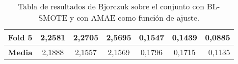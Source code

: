 \begin{table}[H]
{\begin{tabular}{|crrrrrr|}
\multicolumn{1}{|c|}{\textbf{Fold 5}} & \multicolumn{1}{c|}{2,2581}            & \multicolumn{1}{c|}{2,2705}              & \multicolumn{1}{c|}{2,5695}          & \multicolumn{1}{c|}{0,1547}            & \multicolumn{1}{c|}{0,1439}              & 0,0885                             \\ \hline
\multicolumn{1}{|c|}{\textbf{Media}}  & \multicolumn{1}{c|}{2,1888}           & \multicolumn{1}{c|}{2,1557}             & \multicolumn{1}{c|}{2,1569}         & \multicolumn{1}{c|}{0,1796}            & \multicolumn{1}{c|}{0,1715}             & 0,1135                            \\ \hline
\end{tabular}%
}
\caption{Tabla de resultados de Bjorczuk sobre el conjunto con BL-SMOTE y con AMAE como función de ajuste.}\label{tablaBJORCZUKconBLSMOTEconAMAE}

\end{table}


